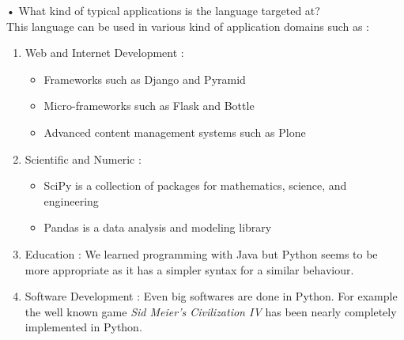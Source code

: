• What kind of typical applications is the language targeted at?\\
This language can be used in various kind of application domains such as :\cite{python_applications}
\begin{enumerate}
    \item{Web and Internet Development : 
        \begin{itemize}
            \item Frameworks such as Django and Pyramid
            \item Micro-frameworks such as Flask and Bottle
            \item Advanced content management systems such as Plone
        \end{itemize}
    }
    \item{Scientific and Numeric :
        \begin{itemize}
            \item SciPy is a collection of packages for mathematics, science, and engineering
            \item Pandas is a data analysis and modeling library
        \end{itemize}
    
    }
    \item{Education : We learned programming with Java but Python seems to be more appropriate as it has a simpler syntax for a similar behaviour.}
    \item{Software Development : Even big softwares are done in Python. For example the well known game \emph{Sid Meier's Civilization IV} has been nearly completely implemented in Python.}
\end{enumerate}
